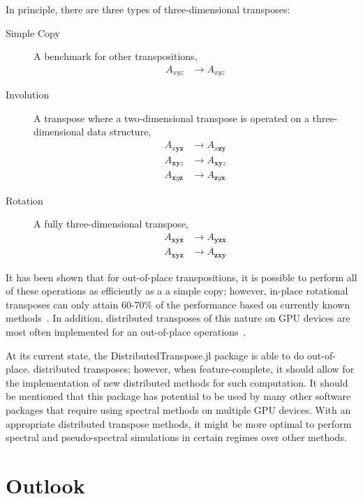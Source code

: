 In principle, there are three types of three-dimensional transposes:

\begin{description}
\item[Simple Copy]{A benchmark for other transpositions,
    \begin{align}
    A_{xyz} &\rightarrow A_{xyz}
    \end{align}}
\item[Involution]{A transpose where a two-dimensional transpose is operated on a three-dimensional data structure,
    \begin{align}
    A_{x\mathbf{yz}} &\rightarrow A_{x\mathbf{zy}} \\
    A_{\mathbf{xy}z} &\rightarrow A_{\mathbf{xy}z} \\
    A_{\mathbf{x}y\mathbf{z}} &\rightarrow A_{\mathbf{z}y\mathbf{x}}
    \end{align}}
\item[Rotation]{A fully three-dimensional transpose,
    \begin{align}
    A_{\mathbf{xyz}} &\rightarrow A_{\mathbf{yzx}} \\
    A_{\mathbf{xyz}} &\rightarrow A_{\mathbf{zxy}}
    \end{align}}
\end{description}

It has been shown that for out-of-place transpositions, it is possible to perform all of these operations as efficiently as a a simple copy; however, in-place rotational transposes can only attain 60-70\% of the performance based on currently known methods~\cite{jodra2015, el2008}.
In addition, distributed transposes of this nature on GPU devices are most often implemented for an out-of-place operations~\cite{ruetsch2013}.

At its current state, the DistributedTranspose.jl package is able to do out-of-place, distributed transposes; however, when feature-complete, it should allow for the implementation of new distributed methods for such computation.
It should be mentioned that this package has potential to be used by many other software packages that require using spectral methods on multiple GPU devices.
With an appropriate distributed transpose methods, it might be more optimal to perform spectral and pseudo-spectral simulations in certain regimes over other methods.

\section{Outlook}

